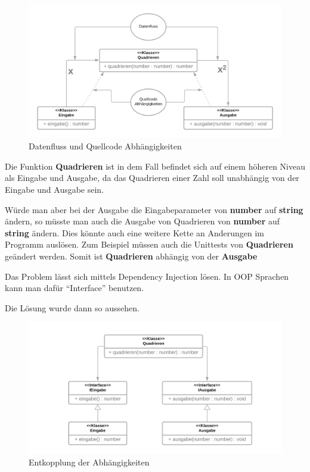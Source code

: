 \documentclass{article}
\begin{document}
    \begin{figure}[H]
        \centering
        \includegraphics[width=1\textwidth]{./images/DepInj_1.png}
        \caption{Datenfluss und Quellcode Abhängigkeiten}
        \label{fig:dateflowVScodedep}
    \end{figure}

    Die Funktion \textbf{Quadrieren} ist in dem Fall befindet sich auf einem höheren Niveau als Eingabe und Ausgabe, 
    da das Quadrieren einer Zahl soll unabhängig von der Eingabe und Ausgabe sein.

    Würde man aber bei der Ausgabe die Eingabeparameter von \textbf{number} auf \textbf{string} ändern, 
    so müsste man auch die Ausgabe von Quadrieren von \textbf{number} auf \textbf{string} ändern.
    Dies könnte auch eine weitere Kette an Anderungen im Programm auslösen. 
    Zum Beispiel müssen auch die Unittests von \textbf{Quadrieren} geändert werden.
    Somit ist \textbf{Quadrieren} abhängig von der \textbf{Ausgabe}

    Das Problem lässt sich mittels Dependency Injection lösen.
    In OOP Sprachen kann man dafür ``Interface'' benutzen.

    Die Lösung wurde dann so aussehen. 
    \begin{figure}[H]
        \centering
        \includegraphics[width=1\textwidth]{./images/DepInj_2.png}
        \caption{Entkopplung der Abhängigkeiten}
        \label{fig:flow around cylinder}
    \end{figure}
\end{document}
